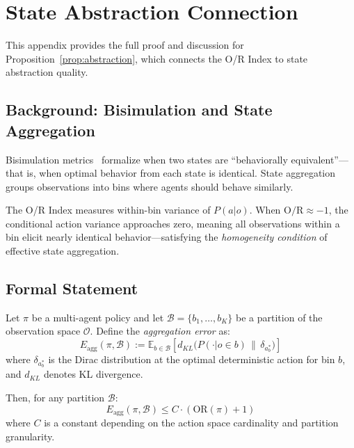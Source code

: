 
\section{State Abstraction Connection}
\label{app:abstraction_proof}

This appendix provides the full proof and discussion for Proposition~\ref{prop:abstraction}, which connects the O/R Index to state abstraction quality.

\subsection{Background: Bisimulation and State Aggregation}

Bisimulation metrics~\citep{ferns2004bisimulation} formalize when two states are ``behaviorally equivalent''---that is, when optimal behavior from each state is identical. State aggregation groups observations into bins where agents should behave similarly.

The O/R Index measures within-bin variance of $P(a|o)$. When $\text{O/R} \approx -1$, the conditional action variance approaches zero, meaning all observations within a bin elicit nearly identical behavior---satisfying the \textit{homogeneity condition} of effective state aggregation.

\subsection{Formal Statement}

\begin{proposition}
\label{prop:abstraction_full}
Let $\pi$ be a multi-agent policy and let $\mathcal{B} = \{b_1, \dots, b_K\}$ be a partition of the observation space $\mathcal{O}$. Define the \textit{aggregation error} as:
\begin{equation}
E_{\text{agg}}(\pi, \mathcal{B}) := \mathbb{E}_{b \in \mathcal{B}} \left[ d_{KL}\Big(P(\cdot | o \in b) \,\|\, \delta_{a^*_b}\Big) \right]
\end{equation}
where $\delta_{a^*_b}$ is the Dirac distribution at the optimal deterministic action for bin $b$, and $d_{KL}$ denotes KL divergence.

Then, for any partition $\mathcal{B}$:
\begin{equation}
E_{\text{agg}}(\pi, \mathcal{B}) \leq C \cdot (\text{OR}(\pi) + 1)
\end{equation}
where $C$ is a constant depending on the action space cardinality and partition granularity.
\end{proposition}

